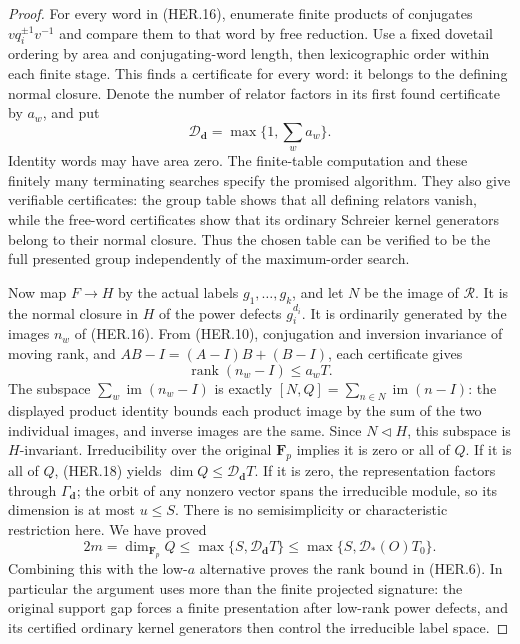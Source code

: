 \begin{proof}
For every word in (HER.16), enumerate finite products of conjugates
\(v q_i^{\pm1}v^{-1}\) and compare them to that word by free reduction.
Use a fixed dovetail ordering by area and conjugating-word length,
then lexicographic order within each finite stage.  This finds a
certificate for every word: it belongs to the defining normal
closure.  Denote the number of relator factors in its first found
certificate by \(a_w\), and put
\[
       \mathcal D_{\boldsymbol d}=\max\{1,\sum_w a_w\}.
 \tag{HER.17}
\]
Identity words may have area zero.  The finite-table computation
and these finitely many terminating searches specify the promised
algorithm.  They also give verifiable certificates: the group
table shows that all defining relators vanish, while the free-word
certificates show that its ordinary Schreier kernel generators
belong to their normal closure.  Thus the chosen table can be
verified to be the full presented group independently of the
maximum-order search.

Now map \(F\to H\) by the actual labels \(g_1,\ldots,g_k\), and let
\(N\) be the image of \(\mathcal R\).  It is the normal closure in
\(H\) of the power defects \(g_i^{d_i}\).  It is ordinarily generated
by the images \(n_w\) of (HER.16).  From (HER.10), conjugation and
inversion invariance of moving rank, and
\(AB-I=(A-I)B+(B-I)\), each certificate gives
\[
             \operatorname{rank}(n_w-I)\le a_w T.
 \tag{HER.18}
\]
The subspace \(\sum_w\operatorname{im}(n_w-I)\) is exactly
\([N,Q]=\sum_{n\in N}\operatorname{im}(n-I)\): the displayed product
identity bounds each product image by the sum of the two individual
images, and inverse images are the same.  Since \(N\triangleleft H\),
this subspace is \(H\)-invariant.  Irreducibility over the original
\(\mathbf F_p\) implies it is zero or all of \(Q\).
If it is all of \(Q\), (HER.18) yields
\(\dim Q\le\mathcal D_{\boldsymbol d}T\).
If it is zero, the representation factors through
\(\Gamma_{\boldsymbol d}\); the orbit of any nonzero vector spans
the irreducible module, so its dimension is at most \(u\le S\).
There is no semisimplicity or characteristic restriction here.
We have proved
\[
       2m=\dim_{\mathbf F_p}Q
          \le\max\{S,\mathcal D_{\boldsymbol d}T\}
          \le\max\{S,\mathcal D_*(O)T_0\}.
 \tag{HER.19}
\]
Combining this with the low-\(a\) alternative proves the rank bound
in (HER.6).  In particular the argument uses more than the finite
projected signature: the original support gap forces a finite
presentation after low-rank power defects, and its certified
ordinary kernel generators then control the irreducible label space.


\end{proof}
